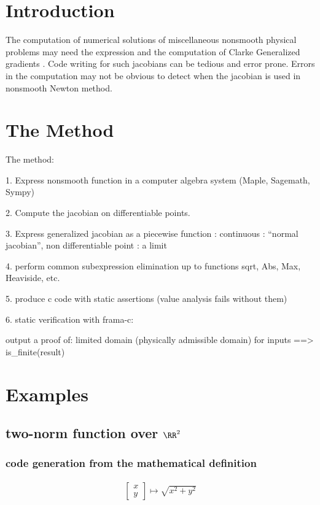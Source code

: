 \documentclass[a4paper]{article}
\begin{document}

\newpage
\tableofcontents
\newpage

\section{Introduction}
The computation of numerical solutions of miscellaneous nonsmooth physical
problems may need the expression and the computation of Clarke Generalized
gradients \cite{Clarke1975}.  Code writing for such jacobians can be tedious
and error prone. Errors in the computation may not be obvious to detect when
the jacobian is used in nonsmooth Newton method.


\section{The Method}


The method:

1. Express nonsmooth function in a computer algebra system (Maple, Sagemath, Sympy)

2. Compute the jacobian on differentiable points.

3. Express generalized jacobian as a piecewise function : continuous : ``normal jacobian'',  non differentiable point : a limit

4. perform common subexpression elimination up to functions sqrt, Abs, Max, Heaviside, etc.

5. produce c code with static assertions (value analysis fails without them)

6. static verification with frama-c:

output a proof of: limited domain (physically admissible domain) for inputs ==> is\_finite(result)

\section{Examples}

\subsection{two-norm function over $\RR^2$}

\subsubsection{code generation from the mathematical definition}
\begin{equation}
  \begin{array}{ll}
  \left [\begin{array}{c}
    x\\
    y
    \end{array} \right] \mapsto \sqrt{x^2+y^2}
  \end{array}
\end{equation}
\end{document}
